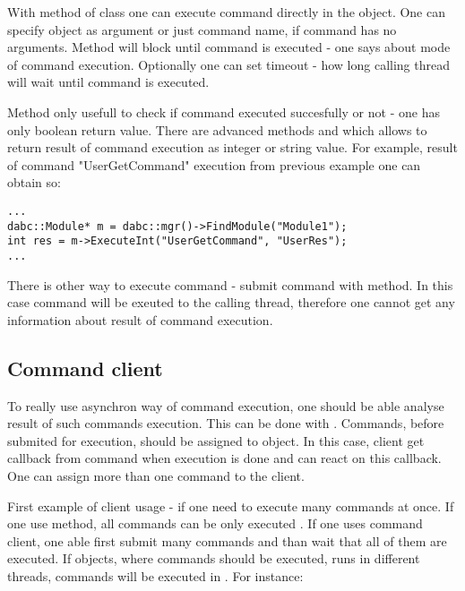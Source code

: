 With method  of class  one can execute 
command directly in the object. One can specify  object as argument
or just command name, if command has no arguments. Method  will block
until command is executed - one says about  mode of command execution. 
Optionally one can set timeout - how long calling thread will wait until command is executed. 

Method  only usefull to check if command executed succesfully or not -
one has only boolean return value. There are advanced methods  and
 which allows to return result of command execution as integer or string value.
For example, result of command "UserGetCommand" execution from previous example one can
obtain so:  

\begin{small}
\begin{verbatim}
...
dabc::Module* m = dabc::mgr()->FindModule("Module1");
int res = m->ExecuteInt("UserGetCommand", "UserRes");
...
\end{verbatim}     
\end{small}


There is other way to execute command - submit command with  method.
In this case command will be exeuted  to the calling thread, therefore
one cannot get any information about result of command execution.


\subsection{Command client}

To really use asynchron way of command execution, one should be able analyse result
of such commands execution. This can be done with .
Commands, before submited for execution, should be assigned to  object.
In this case, client get callback from command when execution is done and can react on this callback.
One can assign more than one command to the client.

First example of client usage - if one need to execute many commands at once.
If one use  method, all commands can be only executed .
If one uses command client, one able first submit many commands and than wait that all
of them are executed. If objects, where commands should be executed, runs in different threads,
commands will be executed in . For instance:

